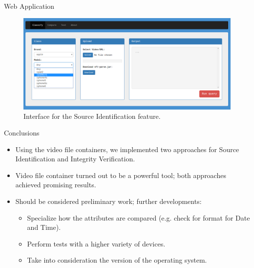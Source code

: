 \begin{tframe}{Web Application}

\begin{figure}
\centering
    \includegraphics[width=1\textwidth]{images/webapp.png}
    \caption{Interface for the Source Identification feature.}
\end{figure}

\end{tframe}

\begin{tframe}{Conclusions}

\begin{itemize}
\item Using the video file containers, we implemented two approaches for Source Identification and Integrity Verification.
\vspace{0.2cm}
\item Video file container turned out to be a powerful tool; both approaches achieved promising results.
\vspace{0.2cm}
\item Should be considered preliminary work; further developments:
\begin{itemize}
\vspace{0.2cm}
\item Specialize how the attributes are compared (e.g. check for format for Date and Time).
\vspace{0.2cm}
\item Perform tests with a higher variety of devices.
\vspace{0.2cm}
\item Take into consideration the version of the operating system.
\end{itemize}
\end{itemize}
\end{tframe}
